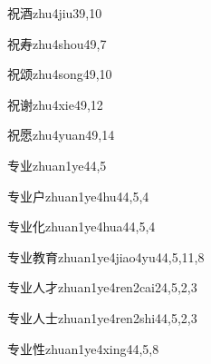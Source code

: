 \begin{verbete}{祝酒}{zhu4jiu3}{9,10}
\end{verbete}

\begin{verbete}{祝寿}{zhu4shou4}{9,7}
\end{verbete}

\begin{verbete}{祝颂}{zhu4song4}{9,10}
\end{verbete}

\begin{verbete}{祝谢}{zhu4xie4}{9,12}
\end{verbete}

\begin{verbete}{祝愿}{zhu4yuan4}{9,14}
\end{verbete}

\begin{verbete}{专业}{zhuan1ye4}{4,5}
\end{verbete}

\begin{verbete}{专业户}{zhuan1ye4hu4}{4,5,4}
\end{verbete}

\begin{verbete}{专业化}{zhuan1ye4hua4}{4,5,4}
\end{verbete}

\begin{verbete}{专业教育}{zhuan1ye4jiao4yu4}{4,5,11,8}
\end{verbete}

\begin{verbete}{专业人才}{zhuan1ye4ren2cai2}{4,5,2,3}
\end{verbete}

\begin{verbete}{专业人士}{zhuan1ye4ren2shi4}{4,5,2,3}
\end{verbete}

\begin{verbete}{专业性}{zhuan1ye4xing4}{4,5,8}
\end{verbete}

